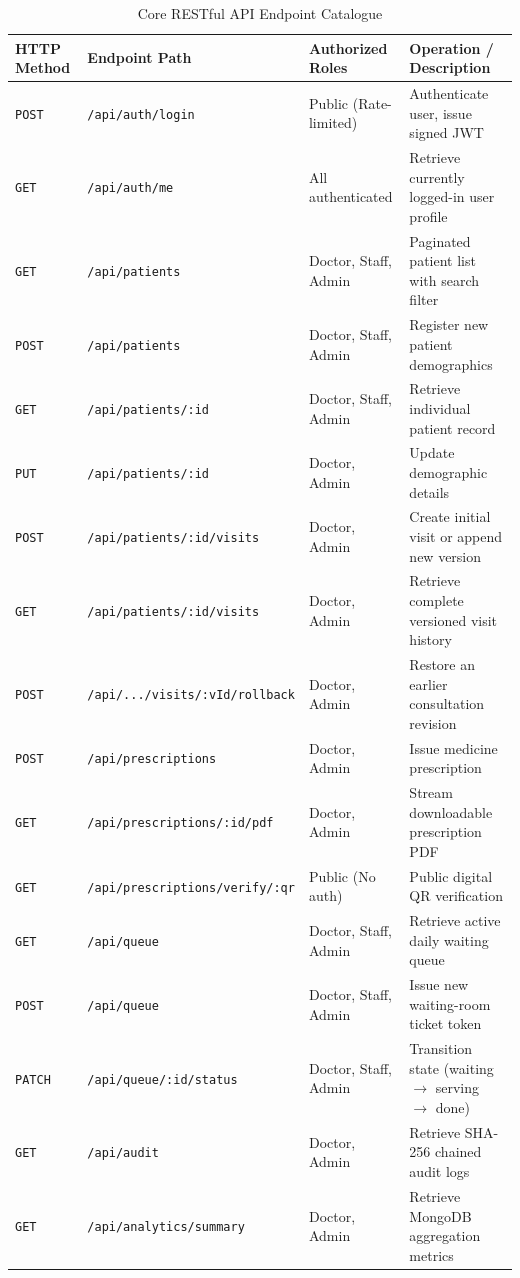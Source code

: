 \documentclass[12pt,a4paper,oneside]{report}
\begin{document}
\begin{table}[h!]
\centering
\caption{Core RESTful API Endpoint Catalogue}
\label{tab:api_catalogue}
\small
\begin{tabularx}{\textwidth}{l l p{3.2cm} X}
\toprule
\textbf{HTTP Method} & \textbf{Endpoint Path} & \textbf{Authorized Roles} & \textbf{Operation / Description} \\
\midrule
\texttt{POST} & \texttt{/api/auth/login} & Public (Rate-limited) & Authenticate user, issue signed JWT \\
\texttt{GET}  & \texttt{/api/auth/me} & All authenticated & Retrieve currently logged-in user profile \\
\midrule
\texttt{GET}  & \texttt{/api/patients} & Doctor, Staff, Admin & Paginated patient list with search filter \\
\texttt{POST} & \texttt{/api/patients} & Doctor, Staff, Admin & Register new patient demographics \\
\texttt{GET}  & \texttt{/api/patients/:id} & Doctor, Staff, Admin & Retrieve individual patient record \\
\texttt{PUT}  & \texttt{/api/patients/:id} & Doctor, Admin & Update demographic details \\
\midrule
\texttt{POST} & \texttt{/api/patients/:id/visits} & Doctor, Admin & Create initial visit or append new version \\
\texttt{GET}  & \texttt{/api/patients/:id/visits} & Doctor, Admin & Retrieve complete versioned visit history \\
\texttt{POST} & \texttt{/api/.../visits/:vId/rollback} & Doctor, Admin & Restore an earlier consultation revision \\
\midrule
\texttt{POST} & \texttt{/api/prescriptions} & Doctor, Admin & Issue medicine prescription \\
\texttt{GET}  & \texttt{/api/prescriptions/:id/pdf} & Doctor, Admin & Stream downloadable prescription PDF \\
\texttt{GET}  & \texttt{/api/prescriptions/verify/:qr} & Public (No auth) & Public digital QR verification \\
\midrule
\texttt{GET}  & \texttt{/api/queue} & Doctor, Staff, Admin & Retrieve active daily waiting queue \\
\texttt{POST} & \texttt{/api/queue} & Doctor, Staff, Admin & Issue new waiting-room ticket token \\
\texttt{PATCH}& \texttt{/api/queue/:id/status} & Doctor, Staff, Admin & Transition state (waiting $\rightarrow$ serving $\rightarrow$ done) \\
\midrule
\texttt{GET}  & \texttt{/api/audit} & Doctor, Admin & Retrieve SHA-256 chained audit logs \\
\texttt{GET}  & \texttt{/api/analytics/summary} & Doctor, Admin & Retrieve MongoDB aggregation metrics \\
\bottomrule
\end{tabularx}
\end{table}
\end{document}
